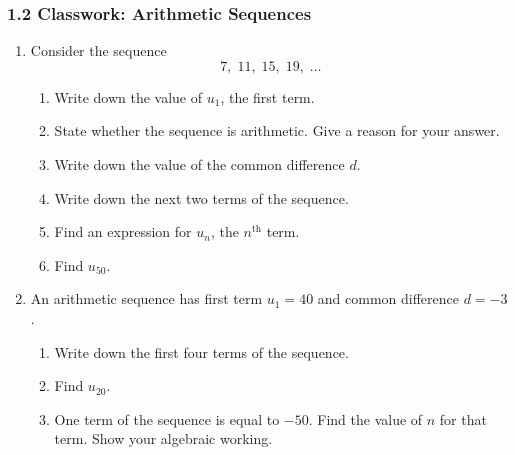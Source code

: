\documentclass[12pt, twoside]{article}
\begin{document}
\subsubsection*{1.2 Classwork: Arithmetic Sequences}

\begin{enumerate}[itemsep=0.15cm]

\item[1.]

Consider the sequence
$$7,\; 11,\; 15,\; 19,\; \ldots$$

\begin{enumerate}[itemsep=0.1cm]
  \item Write down the value of $u_{1}$, the first term.
  \item State whether the sequence is arithmetic. Give a reason for
  your answer.
  \item Write down the value of the common difference $d$.
  \item Write down the next two terms of the sequence.
  \item Find an expression for $u_{n}$, the $n^{\text{th}}$ term.

  \item Find $u_{50}$.
\end{enumerate}


\newpage

\item[2.]

An arithmetic sequence has first term $u_{1} = 40$ and common
difference $d = -3$.

\begin{enumerate}[itemsep=0.1cm]
  \item Write down the first four terms of the sequence.
  \item Find $u_{20}$.
  \item One term of the sequence is equal to $-50$. Find the value of
  $n$ for that term. Show your algebraic working.
\end{enumerate}


\end{enumerate}
\end{document}
